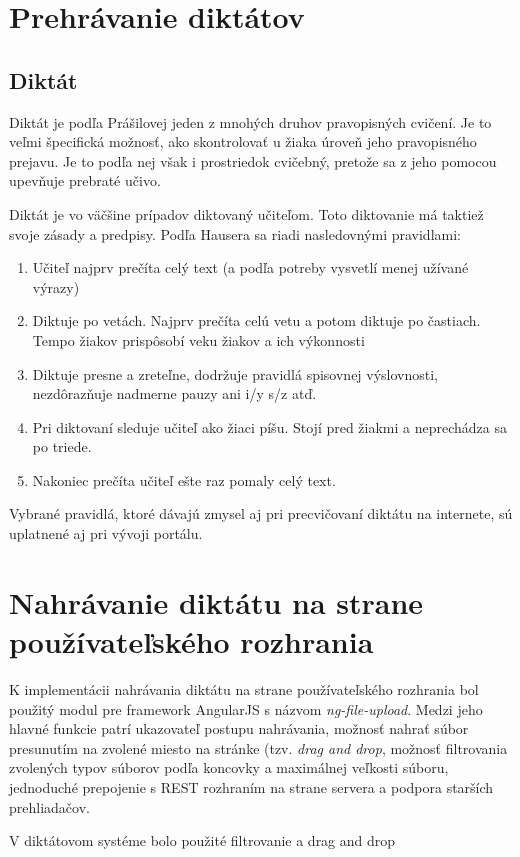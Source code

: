 \documentclass[12pt,oneside]{fithesis2}
\begin{document}
     \section{Prehrávanie diktátov}
            \subsection{Diktát}
	\par Diktát je podľa Prášilovej\cite{prasilova14} jeden z mnohých druhov pravopisných cvičení. Je to veľmi špecifická možnosť, ako skontrolovať u žiaka úroveň jeho pravopisného prejavu. Je to podľa nej však i prostriedok cvičebný, pretože sa z jeho pomocou upevňuje prebraté učivo. 
	\par Diktát je vo väčšine prípadov diktovaný učiteľom. Toto diktovanie má taktiež svoje zásady a predpisy. Podľa Hausera\cite{hauser94} sa riadi nasledovnými pravidlami:
	      \begin{enumerate}
	\item Učiteľ najprv prečíta celý text (a podľa potreby vysvetlí menej užívané výrazy)
	\item Diktuje po vetách. Najprv prečíta celú vetu a potom diktuje po častiach. Tempo žiakov prispôsobí veku žiakov a ich výkonnosti
	\item Diktuje presne a zreteľne, dodržuje pravidlá spisovnej výslovnosti, nezdôrazňuje nadmerne pauzy ani i/y s/z atď.
	\item Pri diktovaní sleduje učiteľ ako žiaci píšu. Stojí pred žiakmi a neprechádza sa po triede.
	\item Nakoniec prečíta učiteľ ešte raz pomaly celý text.
\end{enumerate}

\par Vybrané pravidlá, ktoré dávajú zmysel aj pri precvičovaní diktátu na internete, sú uplatnené aj pri vývoji portálu.

\section{Nahrávanie diktátu na strane používateľského rozhrania}
	\par K implementácii nahrávania diktátu na strane používateľského rozhrania bol použitý modul pre framework AngularJS s názvom \textit{ng-file-upload}. Medzi jeho hlavné funkcie patrí ukazovateľ postupu nahrávania, možnosť nahrať súbor presunutím na zvolené miesto na stránke (tzv. \textit{drag and drop}, možnosť filtrovania zvolených typov súborov podľa koncovky a maximálnej veľkosti súboru, jednoduché prepojenie s REST rozhraním na strane servera a podpora starších prehliadačov\cite{fileupload}.
	\par V diktátovom systéme bolo použité filtrovanie a drag and drop
	
\end{document}
